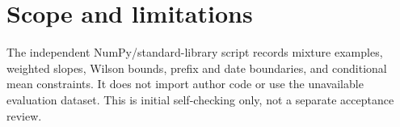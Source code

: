 \documentclass[10pt]{article}
\begin{document}
\section*{Scope and limitations}
The independent NumPy/standard-library script records mixture examples, weighted slopes, Wilson bounds, prefix and date boundaries, and conditional mean constraints. It does not import author code or use the unavailable evaluation dataset. This is initial self-checking only, not a separate acceptance review.\par
\end{document}
